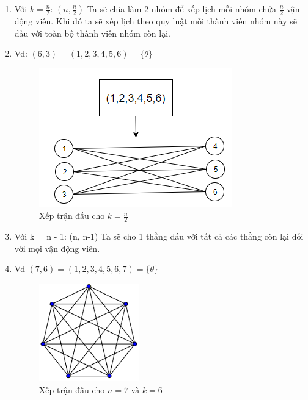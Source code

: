 \documentclass[13pt,a4paper]{article}
\begin{document}
\begin{enumerate}
	 \item Với $k = \frac{n}{2}$: $(n, \frac{n}{2})$ Ta sẽ chia làm 2 nhóm để xếp lịch mỗi nhóm chứa $\frac{n}{2}$ vận động viên. Khi đó ta sẽ xếp lịch theo quy luật mỗi thành viên nhóm này sẽ đấu với toàn bộ thành viên nhóm còn lại.
	 \item[] Vd: $(6,3) = (1,2,3,4,5,6) = \lbrace \theta \rbrace $
	 \begin{figure}[H]
	 	\centering
	 	\includegraphics[scale=0.7]{./image/kn_2.png}
	 	\caption{Xếp trận đấu cho $k = \frac{n}{2}$}
	 \end{figure}
	 \newpage
	 
	 
	 \item Với k = n - 1: (n, n-1) Ta sẽ cho 1 thằng đấu với tất cả các thằng còn lại đối với mọi vận động viên.
	 \item[] Vd $(7,6) = (1,2,3,4,5,6,7) = \lbrace \theta \rbrace $
	 \begin{figure}[H]
	 	\centering
	 	\includegraphics[scale=0.7]{./image/k_n_1.png}
	 	\caption{Xếp trận đấu cho $n = 7$ và $k = 6$}
	 \end{figure}
	 

\end{enumerate}
\end{document}
